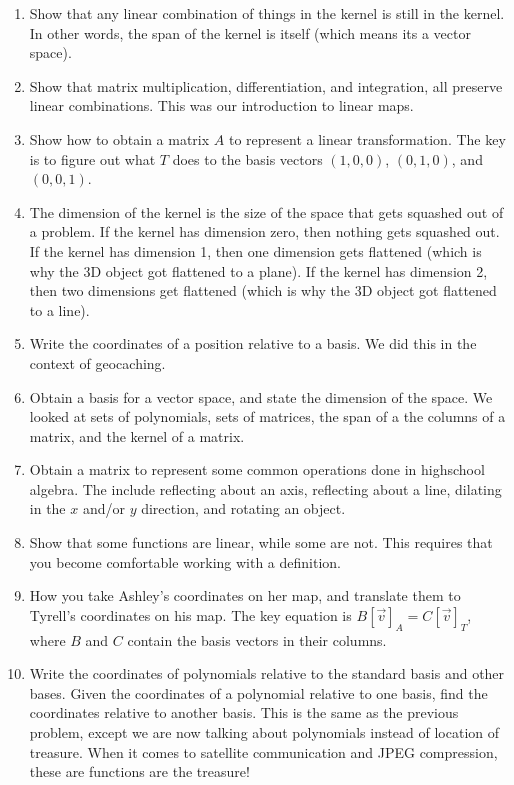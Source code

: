 \documentclass[letterpaper,oneside]{book}%
\theoremstyle{plain}
\theoremstyle{box}
\theoremstyle{problem}
\begin{document}
\begin{enumerate}
 \item Show that any linear combination of things in the kernel is still in the kernel.  In other words, the span of the kernel is itself (which means its a vector space).
 \item Show that matrix multiplication, differentiation, and integration, all preserve linear combinations.  This was our introduction to linear maps.
 \item Show how to obtain a matrix $A$ to represent a linear transformation.  The key is to figure out what $T$ does to the basis vectors $(1,0,0)$, $(0,1,0)$, and $(0,0,1)$. 
 \item The dimension of the kernel is the size of the space that gets squashed out of a problem. If the kernel has dimension zero, then nothing gets squashed out.  If the kernel has dimension 1, then one dimension gets flattened (which is why the 3D object got flattened to a plane).  If the kernel has dimension 2, then two dimensions get flattened (which is why the 3D object got flattened to a line).
 \item Write the coordinates of a position relative to a basis. We did this in the context of geocaching. 
 \item Obtain a basis for a vector space, and state the dimension of the space. We looked at sets of polynomials, sets of matrices, the span of a the columns of a matrix, and the kernel of a matrix.
 \item Obtain a matrix to represent some common operations done in highschool algebra.  The include reflecting about an axis, reflecting about a line, dilating in the $x$ and/or $y$ direction, and rotating an object. 
 \item Show that some functions are linear, while some are not.  This requires that you become comfortable working with a definition.
 \item How you take Ashley's coordinates on her map, and translate them to Tyrell's coordinates on his map.  The key equation is $B[\vec v]_A = C[\vec v]_T$, where $B$ and $C$ contain the basis vectors in their columns.
 \item Write the coordinates of polynomials relative to the standard basis and other bases. Given the coordinates of a polynomial relative to one basis, find the coordinates relative to another basis.  This is the same as the previous problem, except we are now talking about polynomials instead of location of treasure.  When it comes to satellite communication and JPEG compression, these are functions are the treasure!

\end{enumerate}
\end{document}

